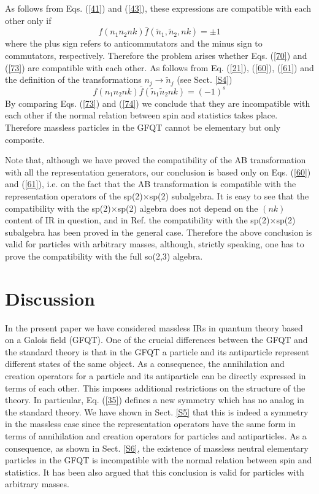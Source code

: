 \documentclass[a4paper,12pt]{article}%
\begin{document}
As follows from Eqs. (\ref{41}) and (\ref{43}),
these expressions are
compatible with each other only if
\begin{equation}
f(n_1n_2nk){\bar f}({\tilde n}_1,{\tilde n}_2,nk)=\pm 1
\label{73}
\end{equation}
where the plus sign refers to anticommutators and the minus
sign to commutators, respectively. Therefore the problem arises
whether Eqs. (\ref{70}) and (\ref{73}) are compatible with
each other. As follows from Eq. (\ref{21}), (\ref{60}),
(\ref{61}) and the definition of the transformations 
$n_j\rightarrow {\tilde n}_j$ (see Sect. \ref{S4}) 
\begin{equation}
f(n_1n_2nk){\bar f}({\tilde n}_1{\tilde n}_2nk)=(-1)^s
\label{74}
\end{equation}
By comparing Eqs. (\ref{73}) and (\ref{74}) we conclude
that they are incompatible with each other if the normal 
relation between spin and statistics takes place. 
Therefore massless particles in the GFQT cannot be
elementary but only composite.

Note that, although we have proved the compatibility of
the AB transformation with all the representation 
generators, our conclusion is based only on Eqs. (\ref{60})
and (\ref{61}), i.e. on the fact that the AB transformation
is compatible with the representation operators of the
sp(2)$\times$sp(2) subalgebra. It is easy to see that
the compatibility with the sp(2)$\times$sp(2) algebra
does not depend on the $(nk)$ content of IR in question,
and in Ref. \cite{lev2} the compatibility with the
sp(2)$\times$sp(2) subalgebra has been proved
in the general case. Therefore the above conclusion is
valid for particles with arbitrary masses, although,
strictly speaking, one has to prove the compatibility
with the full so(2,3) algebra.

\section{Discussion}
\label{S7}

In the present paper we have considered massless IRs in
quantum theory based on a Galois field (GFQT). One of
the crucial differences between the GFQT and the 
standard theory is that in the GFQT a particle and its 
antiparticle represent different states of the same 
object. As a consequence, the annihilation and creation
operators for a particle and its antiparticle can be 
directly expressed in terms of each other. This imposes 
additional restrictions on the structure of the theory. 
In particular, Eq. (\ref{35}) defines a new symmetry which
has no analog in the standard theory. We have shown in
Sect. \ref{S5} that this is indeed a symmetry in the
massless case since the representation operators have 
the same form in terms of annihilation and creation 
operators for particles and antiparticles. As a consequence,
as shown in Sect. \ref{S6}, the existence of massless 
neutral elementary particles in the GFQT is incompatible
with the normal relation between spin and statistics. It
has been also argued that this conclusion is valid for
particles with arbitrary masses.   
\end{document}

